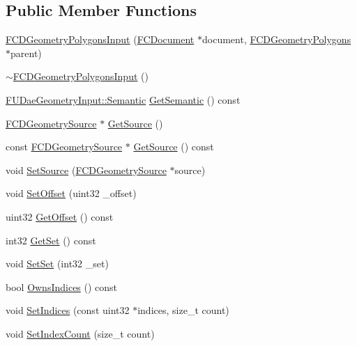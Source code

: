 \subsection*{Public Member Functions}
\begin{DoxyCompactItemize}
\item 
\hyperlink{classFCDGeometryPolygonsInput_af28777c31ffe03f0ec9e5928a98f9f96}{FCDGeometryPolygonsInput} (\hyperlink{classFCDocument}{FCDocument} $\ast$document, \hyperlink{classFCDGeometryPolygons}{FCDGeometryPolygons} $\ast$parent)
\item 
\hyperlink{classFCDGeometryPolygonsInput_a81ec274561e90c9c103e4de83a8d2a1d}{$\sim$FCDGeometryPolygonsInput} ()
\item 
\hyperlink{namespaceFUDaeGeometryInput_a0f887d29f54b10338ebcf73789a7a061}{FUDaeGeometryInput::Semantic} \hyperlink{classFCDGeometryPolygonsInput_a00b2b196c94ff22d4ae2cec3759abdc7}{GetSemantic} () const 
\item 
\hyperlink{classFCDGeometrySource}{FCDGeometrySource} $\ast$ \hyperlink{classFCDGeometryPolygonsInput_a713b84b7aeb8f5c0d22ca380c7d5848b}{GetSource} ()
\item 
const \hyperlink{classFCDGeometrySource}{FCDGeometrySource} $\ast$ \hyperlink{classFCDGeometryPolygonsInput_aa2a070f88c0aba41707dfb91e0522a2a}{GetSource} () const 
\item 
void \hyperlink{classFCDGeometryPolygonsInput_a274087545c26f22c7e815375b100aeff}{SetSource} (\hyperlink{classFCDGeometrySource}{FCDGeometrySource} $\ast$source)
\item 
void \hyperlink{classFCDGeometryPolygonsInput_aac3017db3ac95e98b7bed95c032eb519}{SetOffset} (uint32 \_\-offset)
\item 
uint32 \hyperlink{classFCDGeometryPolygonsInput_ae397c60491172cacd7378d0b58b937d3}{GetOffset} () const 
\item 
int32 \hyperlink{classFCDGeometryPolygonsInput_a1b0484d39f26b21e5c100bf9c9995ca4}{GetSet} () const 
\item 
void \hyperlink{classFCDGeometryPolygonsInput_a50c9f9a8af36be7635b0cd4d08419851}{SetSet} (int32 \_\-set)
\item 
bool \hyperlink{classFCDGeometryPolygonsInput_ae371191aa9f4672d8a9b2c02c25426ce}{OwnsIndices} () const 
\item 
void \hyperlink{classFCDGeometryPolygonsInput_a27b48af070d7f0df605acbc77000d79a}{SetIndices} (const uint32 $\ast$indices, size\_\-t count)
\item 
void \hyperlink{classFCDGeometryPolygonsInput_adcf7935cdd571608bd926e43a798835c}{SetIndexCount} (size\_\-t count)

\end{DoxyCompactItemize}
